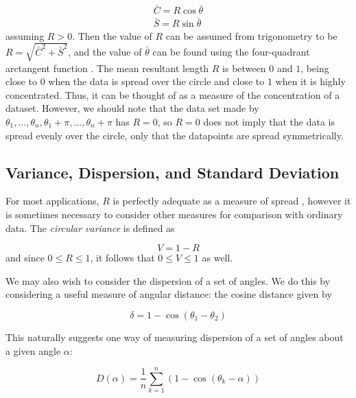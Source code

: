 \documentclass[12pt]{article}
\numberwithin{equation}{section}
\numberwithin{figure}{section}
\begin{document}
\begin{equation}\label{eq:RandT}
\begin{aligned}
\bar{C} = R \cos \bar{\theta} \\
\bar{S} = R \sin \bar{\theta}
\end{aligned}
\end{equation}
assuming $R>0$. Then the value of $R$ can be assumed from trigonometry to be $R = \sqrt{\bar{C}^2+\bar{S}^2}$, and the value of $\bar{\theta}$ can be found using the four-quadrant arctangent function \cite{Kanti}. The mean resultant length $R$ is between $0$ and $1$, being close to $0$ when the data is spread over the circle and close to $1$ when it is highly concentrated. Thus, it can be thought of as a measure of the concentration of a dataset. However, we should note that the data set made by $\theta_1, ..., \theta_n, \theta_1+\pi, ..., \theta_n+\pi$ has $R=0$, so $R=0$ does not imply that the data is spread evenly over the circle, only that the datapoints are spread symmetrically.

\subsection{Variance, Dispersion, and Standard Deviation}

For most applications, $R$ is perfectly adequate as a measure of spread \cite{Kanti}, however it is sometimes necessary to consider other measures for comparison with ordinary data. The \textit{circular variance} is defined as

\begin{equation}\label{eq:circvar}
V = 1-R
\end{equation}
and since $0\le R\le 1$, it follows that $0 \le V \le 1$ as well.

We may also wish to consider the dispersion of a set of angles. We do this by considering a useful measure of angular distance: the cosine distance given by 

\begin{equation}\label{eq:cosdist}
\delta = 1-\cos(\theta_1-\theta_2)
\end{equation}

This naturally suggests one way of measuring dispersion of a set of angles about a given angle $\alpha$:

\begin{equation}\label{eq:disp}
D(\alpha) = \frac{1}{n}\sum_{k=1}^n (1-\cos(\theta_k-\alpha))
\end{equation}
\end{document}

